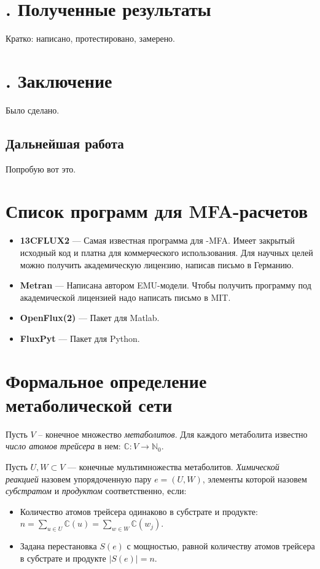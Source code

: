 \documentclass[14pt, a4paper]{extreport}
\begin{document}
\chapter[Полученные результаты]{\thechapter{}. Полученные результаты}
Кратко: написано, протестировано, замерено.

\chapter[Заключение]{\thechapter{}. Заключение}
Было сделано. 
\section{Дальнейшая работа}
Попробую вот это.


\begin{appendices}
	\chapter{Список программ для MFA-расчетов}
	\begin{itemize}
		\item \textbf{13CFLUX2} --- Самая известная программа для -MFA. Имеет закрытый исходный код и платна для коммерческого использования. Для научных целей можно получить академическую лицензию, написав письмо в Германию\cite{13CFLUX2}.
		
		\item \textbf{Metran} --- Написана автором EMU-модели. Чтобы получить программу под академической лицензией надо написать письмо в MIT.
		
		\item \textbf{OpenFlux(2)} --- Пакет для Matlab\cite{OpenFlux, OpenFlux2}.
		
		\item \textbf{FluxPyt} --- Пакет для Python\cite{FluxPyt}.
	\end{itemize}
	
	
	\chapter{Формальное определение метаболической сети}
	Пусть $V$ -- конечное множество \emph{метаболитов}. Для каждого метаболита известно \emph{число атомов трейсера} в нем: $\mathbb{C} \colon V \to \mathbb{N}_0$. 
	
	Пусть $U, W \subset V$ --- конечные мультимножества метаболитов. \emph{Химической реакцией} назовем упорядоченную пару $e = (U, W)$, элементы которой назовем \emph{субстратом} и \emph{продуктом} соответственно, если:
	\begin{itemize}
		\item Количество атомов трейсера одинаково в субстрате и продукте: \\ $n = \sum_{u \in U} \mathbb{C}(u) = \sum_{w \in W} \mathbb{C}(w_j)$. 
		\item Задана перестановка $S(e)$ с мощностью, равной количеству атомов трейсера в субстрате и продукте $|S(e)| = n$.
	\end{itemize}
	

\end{appendices}
\end{document}
